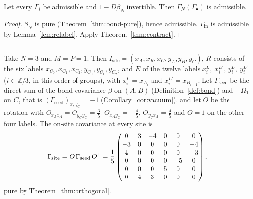 \begin{theorem}\label{thm:periodic}
Let every $\Gamma_i$ be admissible and $1-D\beta_N$ invertible. Then
$\Gamma_N(\Gamma_\bullet)$ is admissible.
\end{theorem}
\begin{proof}
$\beta_N$ is pure (Theorem~\ref{thm:bond-pure}), hence admissible.
$\Gamma_{\mathrm{in}}$ is admissible by Lemma~\ref{lem:relabel}. Apply
Theorem~\ref{thm:contract}.
\end{proof}
\begin{remark}\label{rem:small-chains}
\end{remark}


\subsection{}
Take $N=3$ and $M=P=1$. Then $I_{\mathrm{site}}=(x_A,x_B,x_C,y_A,y_B,y_C)$, $R$ consists of the six
labels $x_{C_0},x_{C_1},x_{C_2},y_{C_0},y_{C_1},y_{C_2}$, and $E$ of the twelve labels
$x^{L}_i,\ x^{L'}_i,\ y^{L}_i,\ y^{L'}_i$ ($i\in\mathbb Z/3$, in this order of groups),
with $x^{L}_i=x_{A_i}$ and $x^{L'}_i=x_{B_{i-1}}$. Let $\Gamma_{\mathrm{seed}}$ be the direct sum of the
bond covariance $\beta$ on $(A,B)$ (Definition~\ref{def:bond}) and $-\Omega_1$ on $C$, that is
$(\Gamma_{\mathrm{seed}})_{x_Cy_C}=-1$ (Corollary~\ref{cor:vacuum}), and let $O$ be the rotation with
$O_{x_Ax_A}=O_{y_Cy_C}=\tfrac35$, $O_{x_Ay_C}=-\tfrac45$, $O_{y_Cx_A}=\tfrac45$ and
$O=1$ on the other four labels. The on-site covariance at every site is
\[
 \Gamma_{\mathrm{site}}=O\,\Gamma_{\mathrm{seed}}\,O^{\mathsf T}=\frac15\begin{pmatrix}
 0&3&-4&0&0&0\\ -3&0&0&0&0&-4\\ 4&0&0&0&0&-3\\ 0&0&0&0&-5&0\\ 0&0&0&5&0&0\\ 0&4&3&0&0&0
 \end{pmatrix},
\]
pure by Theorem~\ref{thm:orthogonal}.

